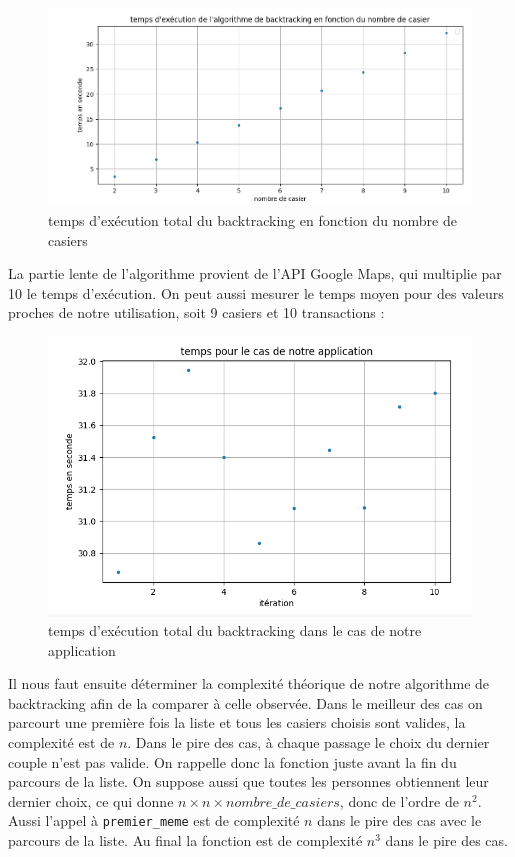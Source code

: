 \documentclass[11pt]{article}
\begin{document}
\begin{figure}[h]
\centering
\includegraphics[scale=0.6]{graph_test5_perf_counter.png}
\caption{temps d'exécution total du backtracking en fonction du nombre de casiers} 
\end{figure}
La partie lente de l'algorithme provient de l'API Google Maps, qui multiplie par 10 le temps d'exécution.
\newpage
On peut aussi mesurer le temps moyen pour des valeurs proches de notre utilisation, soit 9 casiers et 10 transactions :
\begin{figure}[h]
     \centering
     \includegraphics[scale=0.6]{graph_test6.png}
     \caption{temps d'exécution total du backtracking dans le cas de notre application} 
\end{figure}

Il nous faut ensuite déterminer la complexité théorique de notre algorithme de backtracking afin de la comparer à celle observée. Dans le meilleur des cas on parcourt une première fois la liste et tous les casiers choisis sont valides, la complexité est de $n$.
Dans le pire des cas, à chaque passage le choix du dernier couple n'est pas valide. On rappelle donc la fonction juste avant la fin du parcours de la liste. On suppose aussi que toutes les personnes obtiennent leur dernier choix, ce qui donne $n\times n \times nombre\_de\_casiers$, donc de l'ordre de $n^2$. Aussi l'appel à \texttt{premier\_meme} est de complexité $n$ dans le pire des cas avec le parcours de la liste. Au final la fonction est de complexité $n^3$ dans le pire des cas.
\end{document}
